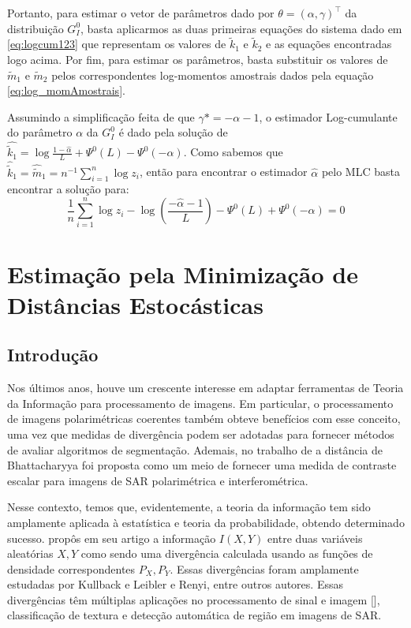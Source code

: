 \documentclass[12pt]{article}
\begin{document}
Portanto, para estimar o vetor de parâmetros dado por $\theta = (\alpha, \gamma)^{\top}$ da distribuição $G_I^0$, basta aplicarmos as duas primeiras equações do sistema dado em \eqref{eq:logcum123} que representam os valores de $\tilde{k}_{1}$ e $\tilde{k}_{2}$ e as equações encontradas logo acima. Por fim, para estimar os parâmetros, basta substituir os valores de $\tilde{m}_{1}$ e $\tilde{m}_{2}$ pelos correspondentes log-momentos amostrais dados pela equação \eqref{eq:log_momAmostrais}. 

Assumindo a simplificação feita de que $\gamma* = -\alpha - 1$, o estimador Log-cumulante do parâmetro $\alpha$ da $G_I^0$ é dado pela solução de $\widehat{\tilde{k}_{1}} = \log \frac{1-\widehat{\alpha}}{L} + \Psi^{0}(L) - \Psi^{0}(-\alpha)$. Como sabemos que $\widehat{\tilde{k}}_{1} = \widehat{\tilde{m}}_{1} = n^{-1}\sum_{i=1}^{n}\log z_i$, então para encontrar o estimador $\widehat{\alpha}$ pelo MLC basta encontrar a solução para:
\begin{equation}
    \frac{1}{n}\sum_{i=1}^{n}\log z_i - \log \left ( \frac{-\widehat{\alpha}-1}{L} \right ) - \Psi^{0}(L) + \Psi^{0}(-\alpha) = 0
    \label{eq:alphaEst_logCum}
\end{equation}

\section{Estimação pela Minimização de Distâncias Estocásticas}

\subsection{Introdução}

Nos últimos anos, houve um crescente interesse em adaptar ferramentas de Teoria da Informação para processamento de imagens. Em particular, o processamento de imagens polarimétricas coerentes também obteve benefícios com esse conceito, uma vez que medidas de divergência podem ser adotadas para fornecer métodos de avaliar algoritmos de segmentação. Ademais, no trabalho de \citet{Goudail:04} a distância de Bhattacharyya foi proposta como um meio de fornecer uma medida de contraste escalar para imagens de SAR polarimétrica e interferométrica.

Nesse contexto, temos que, evidentemente, a teoria da informação tem sido amplamente aplicada à estatística e teoria da probabilidade, obtendo determinado sucesso. \citet{Shannon48} propôs em seu artigo a informação $I(X,Y)$ entre duas variáveis aleatórias $X, Y$ como sendo uma divergência calculada usando as funções de densidade correspondentes $P_{X}, P_{Y}$. Essas divergências foram amplamente estudadas por Kullback e Leibler e Renyi, entre outros autores. Essas divergências têm múltiplas aplicações no processamento de sinal e imagem [\citet{Aviyente}], classificação de textura e detecção automática de região em imagens de SAR.
\end{document}

